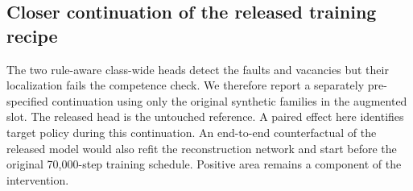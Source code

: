 \subsection{Closer continuation of the released training recipe}
The two rule-aware class-wide heads detect the faults and vacancies but their localization fails the competence check. We therefore report a separately pre-specified continuation using only the original synthetic families in the augmented slot. The released head is the untouched reference. A paired effect here identifies target policy during this continuation. An end-to-end counterfactual of the released model would also refit the reconstruction network and start before the original 70,000-step training schedule. Positive area remains a component of the intervention.


\begin{table}[t]
\centering
\caption{\textbf{Upstream-only continuation on extracted maps.} The original SALAD-style augmentations are used without explicit relocation targets from the pushpin rule. Scene alerts and spatial metrics have the same definitions as the main table.}
\label{tab:upstream_e}
\small
\setlength{\tabcolsep}{4pt}

\end{table}

\begin{table}[t]
\centering
\caption{\textbf{Upstream-only continuation on oracle labels.} The released oracle path is shown for comparison.}
\label{tab:upstream_o}
\small
\setlength{\tabcolsep}{4pt}

\end{table}

\begin{table}[t]
\centering
\caption{\textbf{Paired differences in the upstream-only continuation.} Untouched marks per fault and percentage-point differences at pre-specified cutoffs.}
\label{tab:upstream_diff}
\small

\end{table}

\begin{table}[t]
\centering
\caption{\textbf{Upstream-only alternate operating points.} Recalls and region area in percent. Counts are marks per photo. The released 99th percentile, 95th percentile and reconstruction product results appear in \cref{tab:operating_v3}.}
\label{tab:upstream_alt}
\scriptsize
\setlength{\tabcolsep}{3pt}

\end{table}

